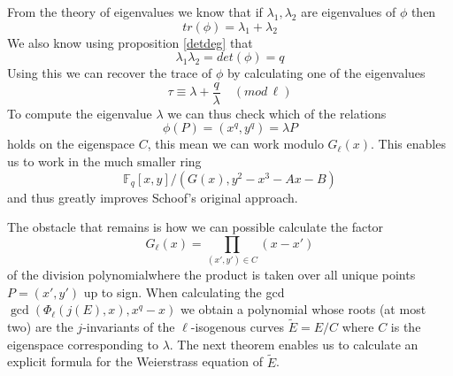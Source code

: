 From the theory of eigenvalues we know that if $\lambda_1, \lambda_2$ are
eigenvalues of $\phi$ then $$tr(\phi) = \lambda_1 + \lambda_2$$
We also know using proposition \ref{detdeg} that $$\lambda_1 \lambda_2 = det(\phi) = q $$
Using this we can recover the trace of $\phi$ by calculating one of the eigenvalues
$$ \tau \equiv \lambda + \frac{q}{\lambda} \quad (mod\, \ell) $$
To compute the eigenvalue $\lambda$ we can thus check which of the relations
$$ \phi(P) = (x^q, y^q) = \lambda P$$
holds on the eigenspace $C$, this mean we can work modulo $G_\ell(x)$. This enables us
to work in the much smaller ring $$\mathbb{F}_q[x,y]/(G(x), y^2 - x^3 - Ax - B) $$
and thus greatly improves Schoof's original approach.

The obstacle that remains is how we can possible calculate the factor 
$$ G_\ell(x) = \prod_{(x',y')\in C} (x-x')$$
of the division polynomialwhere the product is taken over all 
unique points $P = (x', y')$ up to sign. When calculating the gcd
$\gcd(\Phi_\ell(j(E), x), x^q - x)$ we obtain a polynomial whose roots
(at most two) are the $j$-invariants of the $\ell$-isogenous curves
$\tilde{E} = E/C$ where $C$ is the eigenspace corresponding to $\lambda$.
The next theorem enables us to calculate an explicit formula for the Weierstrass
equation of $\tilde{E}$.

